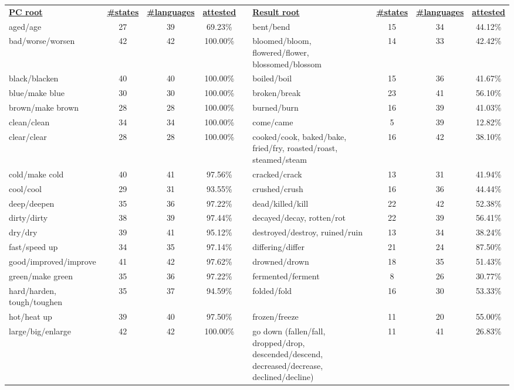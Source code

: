 \begin{tabular}{p{3cm}ccccp{3cm}ccc}
\underline{\textbf{PC root}} & \underline{\textbf{\#states}} & \underline{\textbf{\#languages}} & \underline{\textbf{attested}} & & \underline{\textbf{Result root}} & \underline{\textbf{\#states}} & \underline{\textbf{\#languages}} & \underline{\textbf{attested}} \\
aged/age & 27 & 39 & 69.23\% & & bent/bend & 15 & 34 & 44.12\% \\
bad/worse/worsen & 42 & 42 & 100.00\% & & bloomed/bloom, flowered/flower, blossomed/blossom & 14 & 33 & 42.42\% \\
black/blacken & 40 & 40 & 100.00\% & & boiled/boil & 15 & 36 & 41.67\% \\
blue/make blue & 30 & 30 & 100.00\% & & broken/break & 23 & 41 & 56.10\% \\
brown/make brown & 28 & 28 & 100.00\% & & burned/burn & 16 & 39 & 41.03\% \\
clean/clean & 34 & 34 & 100.00\% & & come/came & 5 & 39 & 12.82\% \\
clear/clear & 28 & 28 & 100.00\% & & cooked/cook, baked/bake, fried/fry, roasted/roast, steamed/steam & 16 & 42 & 38.10\% \\
cold/make cold & 40 & 41 & 97.56\% & & cracked/crack & 13 & 31 & 41.94\% \\
cool/cool & 29 & 31 & 93.55\% & & crushed/crush & 16 & 36 & 44.44\% \\
deep/deepen & 35 & 36 & 97.22\% & & dead/killed/kill & 22 & 42 & 52.38\% \\
dirty/dirty & 38 & 39 & 97.44\% & & decayed/decay, rotten/rot & 22 & 39 & 56.41\% \\
dry/dry & 39 & 41 & 95.12\% & & destroyed/destroy, ruined/ruin & 13 & 34 & 38.24\% \\
fast/speed up & 34 & 35 & 97.14\% & & differing/differ & 21 & 24 & 87.50\% \\
good/improved/improve & 41 & 42 & 97.62\% & & drowned/drown & 18 & 35 & 51.43\% \\
green/make green & 35 & 36 & 97.22\% & & fermented/ferment & 8 & 26 & 30.77\% \\
hard/harden, tough/toughen & 35 & 37 & 94.59\% & & folded/fold & 16 & 30 & 53.33\% \\
hot/heat up & 39 & 40 & 97.50\% & & frozen/freeze & 11 & 20 & 55.00\% \\
large/big/enlarge & 42 & 42 & 100.00\% & & go down (fallen/fall, dropped/drop, descended/descend, decreased/decrease, declined/decline) & 11 & 41 & 26.83\% \\

\end{tabular}
